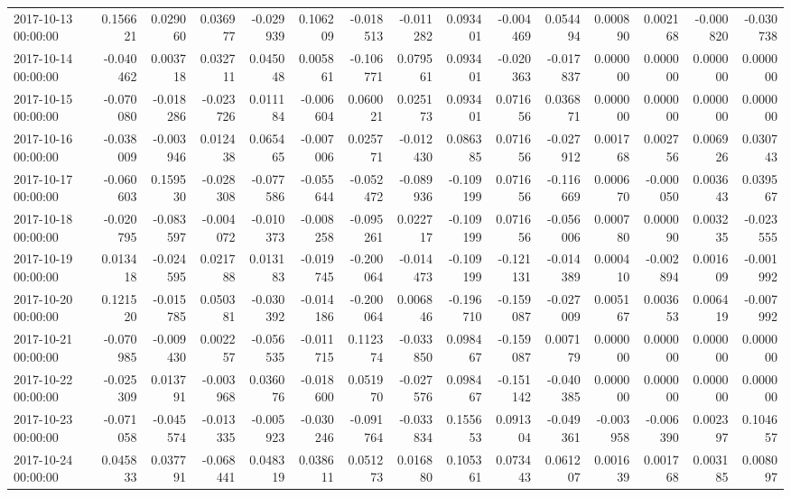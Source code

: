 \begin{tabular}{lrrrrrrrrrrrrrr}
2017-10-13 00:00:00 & 0.156621 & 0.029060 & 0.036977 & -0.029939 & 0.106209 & -0.018513 & -0.011282 & 0.093401 & -0.004469 & 0.054494 & 0.000890 & 0.002168 & -0.000820 & -0.030738 \\
2017-10-14 00:00:00 & -0.040462 & 0.003718 & 0.032711 & 0.045048 & 0.005861 & -0.106771 & 0.079561 & 0.093401 & -0.020363 & -0.017837 & 0.000000 & 0.000000 & 0.000000 & 0.000000 \\
2017-10-15 00:00:00 & -0.070080 & -0.018286 & -0.023726 & 0.011184 & -0.006604 & 0.060021 & 0.025173 & 0.093401 & 0.071656 & 0.036871 & 0.000000 & 0.000000 & 0.000000 & 0.000000 \\
2017-10-16 00:00:00 & -0.038009 & -0.003946 & 0.012438 & 0.065465 & -0.007006 & 0.025771 & -0.012430 & 0.086385 & 0.071656 & -0.027912 & 0.001768 & 0.002756 & 0.006926 & 0.030743 \\
2017-10-17 00:00:00 & -0.060603 & 0.159530 & -0.028308 & -0.077586 & -0.055644 & -0.052472 & -0.089936 & -0.109199 & 0.071656 & -0.116669 & 0.000670 & -0.000050 & 0.003643 & 0.039567 \\
2017-10-18 00:00:00 & -0.020795 & -0.083597 & -0.004072 & -0.010373 & -0.008258 & -0.095261 & 0.022717 & -0.109199 & 0.071656 & -0.056006 & 0.000780 & 0.000090 & 0.003235 & -0.023555 \\
2017-10-19 00:00:00 & 0.013418 & -0.024595 & 0.021788 & 0.013183 & -0.019745 & -0.200064 & -0.014473 & -0.109199 & -0.121131 & -0.014389 & 0.000410 & -0.002894 & 0.001609 & -0.001992 \\
2017-10-20 00:00:00 & 0.121520 & -0.015785 & 0.050381 & -0.030392 & -0.014186 & -0.200064 & 0.006846 & -0.196710 & -0.159087 & -0.027009 & 0.005167 & 0.003653 & 0.006419 & -0.007992 \\
2017-10-21 00:00:00 & -0.070985 & -0.009430 & 0.002257 & -0.056535 & -0.011715 & 0.112374 & -0.033850 & 0.098467 & -0.159087 & 0.007179 & 0.000000 & 0.000000 & 0.000000 & 0.000000 \\
2017-10-22 00:00:00 & -0.025309 & 0.013791 & -0.003968 & 0.036076 & -0.018600 & 0.051970 & -0.027576 & 0.098467 & -0.151142 & -0.040385 & 0.000000 & 0.000000 & 0.000000 & 0.000000 \\
2017-10-23 00:00:00 & -0.071058 & -0.045574 & -0.013335 & -0.005923 & -0.030246 & -0.091764 & -0.033834 & 0.155653 & 0.091304 & -0.049361 & -0.003958 & -0.006390 & 0.002397 & 0.104657 \\
2017-10-24 00:00:00 & 0.045833 & 0.037791 & -0.068441 & 0.048319 & 0.038611 & 0.051273 & 0.016880 & 0.105361 & 0.073443 & 0.061207 & 0.001639 & 0.001768 & 0.003185 & 0.008097 \\

\end{tabular}
